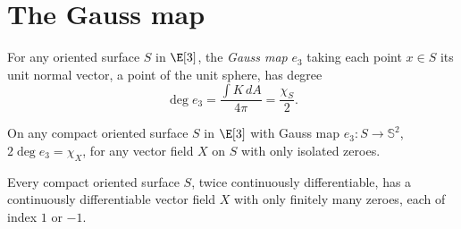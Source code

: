 \section{The Gauss map}
For any oriented surface \(S\) in \(\E[3]\), the \emph{Gauss map} \(e_3\) taking each point \(x \in S\) its unit normal vector, a point of the unit sphere, has degree
\[
\deg e_3 = \frac{\int K \, dA}{4 \pi}=\frac{\chi_S}{2}.
\]
\begin{theorem}
On any compact oriented surface \(S\) in \(\E[3]\) with Gauss map \(e_3 \colon S \to \mathbb{S}^2\), \(2 \deg e_3 = \chi_X\), for any vector field \(X\) on \(S\) with only isolated zeroes.
\end{theorem}
\begin{theorem}\label{theorem:exists.decent.vf}
Every compact oriented surface \(S\), twice continuously differentiable, has a continuously differentiable vector field \(X\) with only finitely many zeroes, each of index \(1\) or \(-1\).
\end{theorem}

